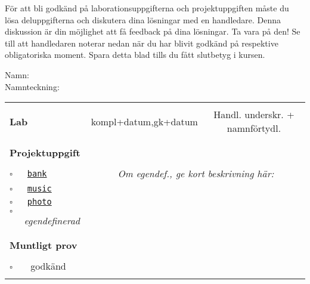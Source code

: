 \vspace{1em}\noindent
För att bli godkänd på laborationsuppgifterna och projektuppgiften måste du lösa deluppgifterna och diskutera dina lösningar med en handledare. Denna diskussion är din möjlighet att få feedback på dina lösningar. Ta vara på den!
Se till att handledaren noterar nedan när du har blivit godkänd på respektive obligatoriska moment. Spara detta blad tills du fått slutbetyg i kursen.


\vspace{2.2em}\noindent Namn: \dotfill\\

\vspace{1em}\noindent Namnteckning: \dotfill\\

\newcommand{\LabRow}[1]{\\[-1.1em] \hyperref[section:lab:#1]{\texttt{#1}} & \dotfill &  \dotfill  \\[0.7em]}  %

\begin{table}[h]
\vspace{1em}
\begin{tabular}{lcc}
\hline%
\\
{\sffamily\bfseries\small Lab} & {\sffamily\small kompl+datum,gk+datum } &	
{\sffamily\small Handl. underskr. + namnförtydl.}\\ %
\\[-0.5em]

\\ 
{\sffamily\small {\bfseries Projektuppgift}} & \dotfill &  \dotfill  \\
\\
{\Large$\square$}\texttt{~~~\hyperref[section:proj:bank]{bank}} &
\multicolumn{2}{c}{\textit{Om egendef., ge kort beskrivning här:}}  \\[0.6em] %
{\Large$\square$}\texttt{~~~\hyperref[section:proj:music]{music}} \\[0.6em] %
{\Large$\square$}\texttt{~~~\hyperref[section:proj:photo]{photo}}  \\[0.6em] %
{\Large$\square$}\texttt{~~~}\textit{egendefinerad}  \\
\\
\\
{\sffamily\small {\bfseries Muntligt prov}} &  & \\
\\
{\Large$\square$}\texttt{~~~} godkänd & \dotfill &  \dotfill \\
\\\hline%
\end{tabular}
\end{table}
